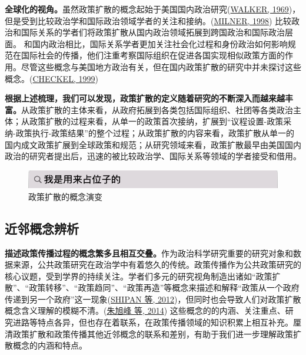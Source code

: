 \documentclass[
  12pt,
]{ctexart}
\begin{document}
\textbf{全球化的视角。}虽然政策扩散的概念起始于美国国内政治研究(\protect\hyperlink{ref-Walker1969}{WALKER, 1969})，但是受到比较政治学和国际政治领域学者的关注和接纳。(\protect\hyperlink{ref-Milner1998}{MILNER, 1998})
比较政治和国际关系的学者们将政策扩散从国内政治领域拓展到跨国政治和国际政治层面。
和国内政治相比，国际关系学者更加关注社会化过程和身份政治如何影响规范在国际社会的传播，他们注重考察国际组织在促进各国实现相似政策方面的作用。尽管这些概念与美国地方政治有关，但在国内政策扩散的研究中并未探讨这些概念。(\protect\hyperlink{ref-Checkel1999}{CHECKEL, 1999})

\textbf{根据上述梳理，我们可以发现，政策扩散的定义随着研究的不断深入而越来越丰富。}从政策扩散的主体来看，从政府拓展到各类包括国际组织、社团等各类政治主体；从政策扩散的过程来看，从单一的政策首次接纳，扩展到``议程设置-政策采纳-政策执行-政策结果''的整个过程；从政策扩散的内容来看，政策扩散从单一的国内成文政策扩展到全球政策和规范；从研究领域来看，政策扩散最早由美国国内政治的研究者提出后，迅速的被比较政治学、国际关系等领域的学者接受和借用。

\begin{figure}
\includegraphics[width=1\linewidth]{../figures/占位子的图} \caption{政策扩散的概念演变}\label{fig:unnamed-chunk-1}
\end{figure}

\hypertarget{ux8fd1ux90bbux6982ux5ff5ux8fa8ux6790}{%
\subsection{近邻概念辨析}\label{ux8fd1ux90bbux6982ux5ff5ux8fa8ux6790}}

\textbf{描述政策传播过程的概念繁多且相互交叠。}作为政治科学研究重要的研究对象和数据来源，公共政策研究在政治学中有着悠久的传统。政策传播作为公共政策研究的核心议题，受到学界的持续关注。学者们多元的研究视角制造出诸如``政策扩散''、``政策转移''、``政策趋同''、``政策再造''等概念来描述和解释``政策从一个政府传递到另一个政府''这一现象(\protect\hyperlink{ref-ShipanVolden2012}{SHIPAN 等, 2012})，但同时也会导致人们对政策扩散概念含义理解的模糊不清。(\protect\hyperlink{ref-ZhuXuFengZhangYouLang2014}{朱旭峰 等, 2014})
这些概念的的内涵、关注重点、研究进路等特点各异，但也存在着联系，在政策传播领域的知识积累上相互补充。厘清政策扩散和政策传播其他近邻概念的联系和差别，有助于我们进一步理解政策扩散概念的内涵和特点。
\end{document}
